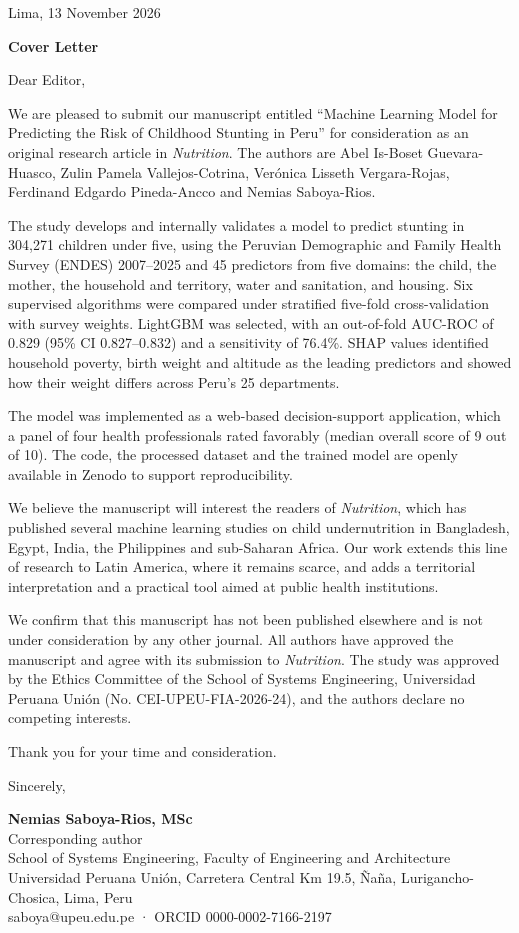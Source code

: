 \documentclass[11pt]{article}
\begin{document}
\hfill Lima, 13 November 2026

\begin{center}\large\bfseries Cover Letter\end{center}

Dear Editor,

We are pleased to submit our manuscript entitled “Machine Learning Model for Predicting the Risk of Childhood Stunting in Peru” for consideration as an original research article in \emph{Nutrition}. The authors are Abel Is-Boset Guevara-Huasco, Zulin Pamela Vallejos-Cotrina, Verónica Lisseth Vergara-Rojas, Ferdinand Edgardo Pineda-Ancco and Nemias Saboya-Rios.

The study develops and internally validates a model to predict stunting in 304,271 children under five, using the Peruvian Demographic and Family Health Survey (ENDES) 2007–2025 and 45 predictors from five domains: the child, the mother, the household and territory, water and sanitation, and housing. Six supervised algorithms were compared under stratified five-fold cross-validation with survey weights. LightGBM was selected, with an out-of-fold AUC-ROC of 0.829 (95\% CI 0.827–0.832) and a sensitivity of 76.4\%. SHAP values identified household poverty, birth weight and altitude as the leading predictors and showed how their weight differs across Peru’s 25 departments.

The model was implemented as a web-based decision-support application, which a panel of four health professionals rated favorably (median overall score of 9 out of 10). The code, the processed dataset and the trained model are openly available in Zenodo to support reproducibility.

We believe the manuscript will interest the readers of \emph{Nutrition}, which has published several machine learning studies on child undernutrition in Bangladesh, Egypt, India, the Philippines and sub-Saharan Africa. Our work extends this line of research to Latin America, where it remains scarce, and adds a territorial interpretation and a practical tool aimed at public health institutions.

We confirm that this manuscript has not been published elsewhere and is not under consideration by any other journal. All authors have approved the manuscript and agree with its submission to \emph{Nutrition}. The study was approved by the Ethics Committee of the School of Systems Engineering, Universidad Peruana Unión (No. CEI-UPEU-FIA-2026-24), and the authors declare no competing interests.

Thank you for your time and consideration.

Sincerely,

\vspace{1.2cm}
{\setlength{\parskip}{0pt}\small \textbf{Nemias Saboya-Rios, MSc}\\Corresponding author\\School of Systems Engineering, Faculty of Engineering and Architecture\\Universidad Peruana Unión, Carretera Central Km 19.5, Ñaña, Lurigancho-Chosica, Lima, Peru\\saboya@upeu.edu.pe · ORCID 0000-0002-7166-2197\par}
\end{document}
